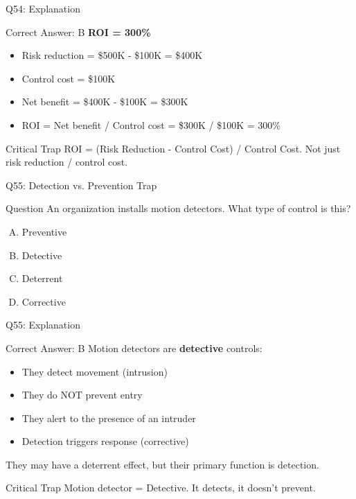 \documentclass{beamer}
\begin{document}
	\begin{frame}{Q54: Explanation}
		\begin{block}{Correct Answer: B}
			\textbf{ROI = 300\%}
			\begin{itemize}
				\item Risk reduction = \$500K - \$100K = \$400K
				\item Control cost = \$100K
				\item Net benefit = \$400K - \$100K = \$300K
				\item ROI = Net benefit / Control cost = \$300K / \$100K = 300\%
			\end{itemize}
		\end{block}
		\begin{alertblock}{Critical Trap}
			ROI = (Risk Reduction - Control Cost) / Control Cost.
			Not just risk reduction / control cost.
		\end{alertblock}
	\end{frame}
	
	\begin{frame}{Q55: Detection vs. Prevention Trap}
		\begin{block}{Question}
			An organization installs motion detectors. What type of control is this?
		\end{block}
		\begin{enumerate}[(A)]
			\item Preventive
			\item Detective
			\item Deterrent
			\item Corrective
		\end{enumerate}
	\end{frame}
	
	\begin{frame}{Q55: Explanation}
		\begin{block}{Correct Answer: B}
			Motion detectors are \textbf{detective} controls:
			\begin{itemize}
				\item They detect movement (intrusion)
				\item They do NOT prevent entry
				\item They alert to the presence of an intruder
				\item Detection triggers response (corrective)
			\end{itemize}
			They may have a deterrent effect, but their primary function is detection.
		\end{block}
		\begin{alertblock}{Critical Trap}
			Motion detector = Detective.
			It detects, it doesn't prevent.
		\end{alertblock}
	\end{frame}
	
\end{document}
